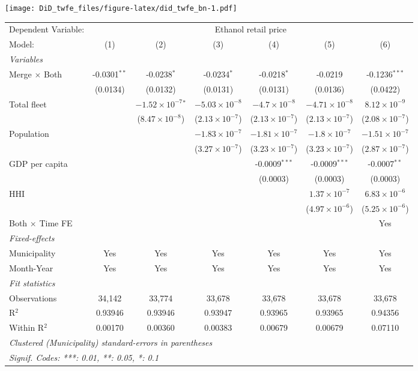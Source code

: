 \documentclass[
]{article}
\begin{document}
\texttt{[image: DiD\_twfe\_files/figure-latex/did\_twfe\_bn-1.pdf]}

\begin{tabular}{lcccccc}
\tabularnewline\midrule\midrule
Dependent Variable:&\multicolumn{6}{c}{Ethanol retail price}\\
Model:&(1) & (2) & (3) & (4) & (5) & (6)\\
\midrule \emph{Variables}&   &   &   &   &   &  \\
Merge $\times $ Both & -0.0301$^{**}$ & -0.0238$^{*}$ & -0.0234$^{*}$ & -0.0218$^{*}$ & -0.0219 & -0.1236$^{***}$\\
  &(0.0134) & (0.0132) & (0.0131) & (0.0131) & (0.0136) & (0.0422)\\
Total fleet &    & $-1.52\times 10^{-7}$$^{*}$ & $-5.03\times 10^{-8}$ & $-4.7\times 10^{-8}$ & $-4.71\times 10^{-8}$ & $8.12\times 10^{-9}$\\
  &   & ($8.47\times 10^{-8}$) & ($2.13\times 10^{-7}$) & ($2.13\times 10^{-7}$) & ($2.13\times 10^{-7}$) & ($2.08\times 10^{-7}$)\\
Population &    &    & $-1.83\times 10^{-7}$ & $-1.81\times 10^{-7}$ & $-1.8\times 10^{-7}$ & $-1.51\times 10^{-7}$\\
  &   &    & ($3.27\times 10^{-7}$) & ($3.23\times 10^{-7}$) & ($3.23\times 10^{-7}$) & ($2.87\times 10^{-7}$)\\
GDP per capita &    &    &    & -0.0009$^{***}$ & -0.0009$^{***}$ & -0.0007$^{**}$\\
  &   &    &    & (0.0003) & (0.0003) & (0.0003)\\
HHI &    &    &    &    & $1.37\times 10^{-7}$ & $6.83\times 10^{-6}$\\
  &   &    &    &    & ($4.97\times 10^{-6}$) & ($5.25\times 10^{-6}$)\\
Both $\times$ Time FE &  &  &  &  &  & Yes\\
\midrule \emph{Fixed-effects}&   &   &   &   &   &  \\
Municipality & Yes & Yes & Yes & Yes & Yes & Yes\\
Month-Year & Yes & Yes & Yes & Yes & Yes & Yes\\
\midrule \emph{Fit statistics}&  & & & & & \\
Observations & 34,142&33,774&33,678&33,678&33,678&33,678\\
R$^2$ & 0.93946&0.93946&0.93947&0.93965&0.93965&0.94356\\
Within R$^2$ & 0.00170&0.00360&0.00383&0.00679&0.00679&0.07110\\
\midrule\midrule\multicolumn{7}{l}{\emph{Clustered (Municipality) standard-errors in parentheses}}\\
\multicolumn{7}{l}{\emph{Signif. Codes: ***: 0.01, **: 0.05, *: 0.1}}\\
\end{tabular}
\end{document}
